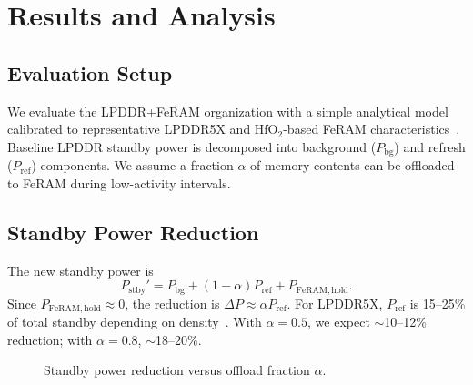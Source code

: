 \section{Results and Analysis}

\subsection{Evaluation Setup}
We evaluate the LPDDR+FeRAM organization with a simple analytical model calibrated to representative LPDDR5X
and HfO$_2$-based FeRAM characteristics~\cite{ChoiIEDM2022,KimIEDM2021}.
Baseline LPDDR standby power is decomposed into background ($P_{\mathrm{bg}}$) and refresh ($P_{\mathrm{ref}}$) components.
We assume a fraction $\alpha$ of memory contents can be offloaded to FeRAM during low-activity intervals.

\subsection{Standby Power Reduction}
The new standby power is
\[
P_{\mathrm{stby}}' = P_{\mathrm{bg}} + (1-\alpha) P_{\mathrm{ref}} + P_{\mathrm{FeRAM,hold}}.
\]
Since $P_{\mathrm{FeRAM,hold}}\!\approx\!0$, the reduction is $\Delta P \approx \alpha P_{\mathrm{ref}}$.
For LPDDR5X, $P_{\mathrm{ref}}$ is 15--25\% of total standby depending on density~\cite{ChoiIEDM2022}.
With $\alpha=0.5$, we expect $\sim$10--12\% reduction; with $\alpha=0.8$, $\sim$18--20\%.

\begin{figure}[t]
  \centering
  \vspace{-1ex}
  \caption{Standby power reduction versus offload fraction $\alpha$.}
  \label{fig:standby_reduction}
\end{figure}

